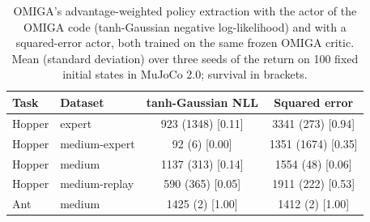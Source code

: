 \begin{table}[t]
\centering
\caption{OMIGA's advantage-weighted policy extraction with the actor of the OMIGA code (tanh-Gaussian negative log-likelihood) and with a squared-error actor, both trained on the same frozen OMIGA critic. Mean (standard deviation) over three seeds of the return on 100 fixed initial states in MuJoCo 2.0; survival in brackets.}
\label{tab:omiga-actor}
\begin{tabular*}{\columnwidth}{@{\extracolsep{\fill}}llcc}
\hline
Task & Dataset & tanh-Gaussian NLL & Squared error \\
\hline
Hopper & expert & 923 (1348) [0.11] & 3341 (273) [0.94] \\
Hopper & medium-expert & 92 (6) [0.00] & 1351 (1674) [0.35] \\
Hopper & medium & 1137 (313) [0.14] & 1554 (48) [0.06] \\
Hopper & medium-replay & 590 (365) [0.05] & 1911 (222) [0.53] \\
Ant & medium & 1425 (2) [1.00] & 1412 (2) [1.00] \\
\hline
\end{tabular*}
\end{table}

